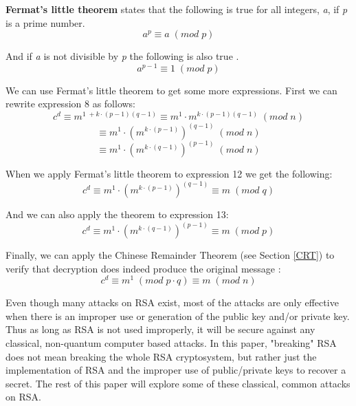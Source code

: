 \documentclass[11pt]{article}
\begin{document}
\textbf{Fermat's little theorem} states that the following is true for all integers, \emph{a}, if \emph{p} is a prime number.
\begin{equation} a^{p} \equiv a \; (mod \; p)\end{equation}

And if \emph{a} is not divisible by \emph{p} the following is also true \cite{rosen}.
\begin{equation} a^{p - 1} \equiv 1 \; (mod \; p)\end{equation}

We can use Fermat's little theorem to get some more expressions. First we can rewrite expression 8 as follows:
\begin{equation}  c^d   \equiv m^{1 \; + k \cdot (p - 1)(q - 1)} \equiv m^{1} \cdot m^{k \cdot (p - 1)(q - 1)}\; (mod \; n) \end{equation}
\begin{equation}  \equiv m^{1} \cdot (m^{k \cdot (p - 1)})^{(q - 1)}\; (mod \; n) \end{equation}
\begin{equation}  \equiv m^{1} \cdot (m^{k \cdot (q - 1)})^{(p - 1)}\; (mod \; n) \end{equation}

When we apply Fermat's little theorem to expression 12 we get the following:
\begin{equation} c^d \equiv m^{1} \cdot (m^{k \cdot (p - 1)})^{(q - 1)} \equiv m \; (mod \; q) \end{equation}

And we can also apply the theorem to expression 13:
\begin{equation} c^d \equiv m^{1} \cdot (m^{k \cdot (q - 1)})^{(p - 1)} \equiv m \; (mod \; p) \end{equation}

Finally, we can apply the Chinese Remainder Theorem (see Section \ref{CRT}) to verify that decryption does indeed produce the original message \cite{rosen}:
\begin{equation} c^d \equiv m^{1} \; (mod \; p \cdot q)\equiv m \; (mod \; n) \end{equation}

Even though many attacks on RSA exist, most of the attacks are only effective when there is an improper use or generation of the public key and/or private key. Thus as long as RSA is not used improperly, it will be secure against any classical, non-quantum computer based attacks. In this paper, "breaking" RSA does not mean breaking the whole RSA cryptosystem, but rather just the implementation of RSA and the improper use of public/private keys to recover a secret. The rest of this paper will explore some of these classical, common attacks on RSA.
\end{document}
